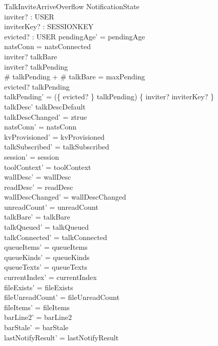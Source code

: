 \documentclass[a4paper,10pt,fleqn]{article}
\begin{document}
\begin{schema}{TalkInviteArriveOverflow}
  \Delta NotificationState \\
  inviter? : USER \\
  inviterKey? : SESSIONKEY \\
  evicted? : USER
  \where
  pendingAge' = pendingAge \\
  natsConn = natsConnected \\
  inviter? \notin talkBare \\
  inviter? \notin \dom talkPending \\
  \# talkPending + \# talkBare = maxPending \\
  evicted? \in \dom talkPending \\
  talkPending' =
  (\{ evicted? \} \ndres talkPending) \oplus
  \{ inviter? \mapsto inviterKey? \} \\
  talkDesc' \neq talkDescDefault \\
  talkDescChanged' = ztrue \\
  natsConn' = natsConn \\
  kvProvisioned' = kvProvisioned \\
  talkSubscribed' = talkSubscribed \\
  session' = session \\
  toolContext' = toolContext \\
  wallDesc' = wallDesc \\
  readDesc' = readDesc \\
  wallDescChanged' = wallDescChanged \\
  unreadCount' = unreadCount \\
  talkBare' = talkBare \\
  talkQueued' = talkQueued \\
  talkConnected' = talkConnected \\
  queueItems' = queueItems \\
  queueKinds' = queueKinds \\
  queueTexts' = queueTexts \\
  currentIndex' = currentIndex \\
  fileExists' = fileExists \\
  fileUnreadCount' = fileUnreadCount \\
  fileItems' = fileItems \\
  barLine2' = barLine2 \\
  barStale' = barStale \\
  lastNotifyResult' = lastNotifyResult \\

\end{schema}
\end{document}
